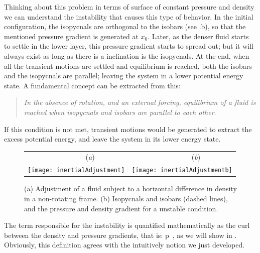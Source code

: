 Thinking about this problem in terms of surface of constant pressure and
density we can understand the instability that causes this type of
behavior. In the initial configuration, the isopycnals are orthogonal to
the isobars (see .b), so that the mentioned pressure
gradient is generated at $x_0$. Later, as the denser fluid starts to
settle in the lower layer, this pressure gradient starts to spread out;
but it will always exist as long as there is a inclination is the
isopycnals. At the end, when all the transient motions are settled and
equilibrium is reached, both  the isobars and the isopycnals are
parallel; leaving the system in a lower potential energy state. A
fundamental concept can be extracted from this:

\begin{quote}
\emph{In the absence of rotation, and an external forcing, equilibrium of
a fluid is reached when isopycnals and isobars are parallel to each
other}.
\end{quote}


If this condition is not met, transient motions would be generated to extract the excess  potential energy, and leave the system in its lower energy state.

\begin{figure}[t]
\begin{center}
 \begin{tabular}{cc}
        ~~~~~~~~(\textit{a})                        &   ~~~~~~~~(\textit{b}) \\
    \texttt{[image: inertialAdjustment]}
    & \texttt{[image: inertialAdjustmentb]}

  \end{tabular}
\end{center}
\caption{
(a) Adjustment of a fluid subject to a horizontal difference in density
    in a non-rotating frame.
(b) Isopycnals and isobars (dashed lines), and the pressure and density
    gradient for a unstable condition.
        }
\label{f:drivedrag}
\end{figure}

The term responsible for the instability is quantified mathematically as
the curl between the density and pressure gradients, that is:
\beq
\nabla \rho \times \nabla p
\,,
as we will show in . Obviously, this definition
agrees with the intuitively notion we just developed.

